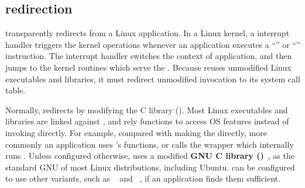 \subsection{\Linuxapi{} redirection}
\label{sec:libos:syscall-redirection}


\thelibos{} transparently redirects \linuxapis{} from a Linux application. In a Linux kernel, a \linuxapi{} interrupt handler
triggers the kernel operations
whenever an application executes
a ``'' or ``'' instruction.
The interrupt handler
switches the context of application,
and then jumps to the kernel routines which serve the \linuxapis{}.
Because \thelibos{} reuses
unmodified Linux executables and libraries,
it must redirect
unmodified \linuxapi{} invocation
to its
system call table. %


Normally,
\thelibos{} redirects \linuxapis{} %
by modifying the C library (\libc{}).
Most Linux executables and libraries
are linked against \libc{},
and rely \libc{} functions to access OS features
instead of
invoking \linuxapis{} directly.
For example,
compared with making the  \linuxapi{} directly,
more commonly
an application uses \libc{}'s  functions,
or calls the \libc{}  wrapper
which internally runs .
Unless configured otherwise, \thelibos{} uses a modified
{\bf GNU C library (\glibc{})}~\cite{glibc},
as the standard GNU \libc{} of most Linux distributions, including Ubuntu.
\graphene{} can be configured to use other \libc{} variants,
such as ~\cite{uclibc} and ~\cite{musl},
if an application finds them sufficient.




